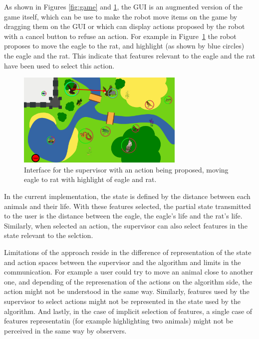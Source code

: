 \documentclass[letterpaper]{article} %
\begin{document}
As shown in Figures \ref{fig:game} and \ref{fig:gui}, the GUI is an augmented
version of the game itself, which can be use to make the robot move items on the
game by dragging them on the GUI or which can display actions proposed by the
robot with a cancel button to refuse an action. For example in
Figure~\ref{fig:gui} the robot proposes to move the eagle to the rat, and
highlight (as shown by blue circles) the eagle and the rat. This indicate that
features relevant to the eagle and the rat have been used to select this action.
\begin{figure}
        \centering
    \includegraphics[width=80mm]{./fig/proposition.png}
    \caption{Interface for the supervisor with an action being proposed, moving
        eagle to rat with highlight of eagle and rat.}
        \label{fig:gui}
\end{figure}


In the current implementation, the state is defined by the distance between each
animals and their life. With these features selected, the partial state
transmitted to the user is the distance between the eagle, the eagle's life and
the rat's life. Similarly, when selected an action, the supervisor can also
select features in the state relevant to the selction.

Limitations of the approach reside in the difference of
representation of the state and action spaces between the supervisor and the
algorithm and limits in the communication. For example a user could try to move
an animal close to another one,
and depending of the represenation of the actions on the algorithm side, the
action might not be understood in the same way. Similarly, features used by the
supervisor to select actions might not be represented in the state used by the
algorithm. And lastly, in the case of implicit selection of features, a single
case of features representatin (for example highlighting two animals) might not
be perceived in the same way by observers.
\end{document}
